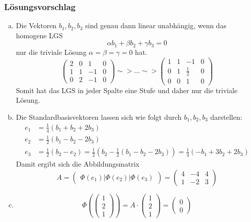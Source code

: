 \documentclass[a4paper,11pt]{scrartcl}
\begin{document}
\subsubsection*{Lösungsvorschlag}
\begin{enumerate}[a)]
\item Die Vektoren $b_1,b_2,b_3$ sind genau dann linear unabhängig, wenn das homogene LGS 
$$
\alpha b_1 +\beta b_2 + \gamma b_3 =0
$$
nur die triviale Lösung $\alpha=\beta=\gamma=0$ hat.
$$
\left(\begin{array}{ccc|c}2&0&1&0\\1&1&-1&0\\0&2&-1&0 \end{array}\right) \sim> ... \sim>\left(\begin{array}{ccc|c} 1&1&-1&0\\ 0&1&\frac{1}{2}&0 \\ 0&0&1&0\end{array}\right)
$$
Somit hat das LGS in jeder Spalte eine Stufe und daher nur die triviale Lösung.
\item Die Standardbasisvektoren lassen sich wie folgt durch $b_1,b_2,b_3$ darstellen:
\begin{align*}
e_1&=\frac{1}{4}(b_1+b_2+2b_3)\\
e_2&=\frac{1}{2}(b_1-b_2-2b_3)\\
e_3&=\frac{1}{2}(b_2-e_2)=\frac{1}{2}(b_2-\frac{1}{2}(b_1-b_2-2b_3))=\frac{1}{4}(-b_1+3b_2+2b_3)
\end{align*}
Damit ergibt sich die Abbildungsmatrix
$$
A=\begin{pmatrix} \Phi(e_1)|\Phi(e_2)|\Phi(e_3) \end{pmatrix}=\begin{pmatrix} 4 & -4 &4 \\ 1&-2&3 \end{pmatrix}
$$
\item 
$$
\Phi(\begin{pmatrix} 1\\2\\1 \end{pmatrix})=A\cdot \begin{pmatrix} 1\\2\\1 \end{pmatrix}=\begin{pmatrix} 0 \\ 0 \end{pmatrix}
$$

\end{enumerate}
\end{document}
